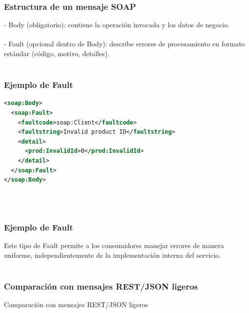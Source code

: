 \documentclass[t,24pt,aspectratio=169]{beamer}
\begin{document}
	\begin{frame}
		\frametitle{Estructura de un mensaje SOAP}
			\vfill
- Body (obligatorio): contiene la operación invocada y los datos de negocio.
\\~\\
- Fault (opcional dentro de Body): describe errores de procesamiento en formato estándar (código, motivo, detalles).
\\~\\
			\vfill
	\end{frame}


	\begin{frame}
		\frametitle{Ejemplo de Fault}
			\vfill

\begin{lstlisting}[language = xml]
<soap:Body>
  <soap:Fault>
    <faultcode>soap:Client</faultcode>
    <faultstring>Invalid product ID</faultstring>
    <detail>
      <prod:InvalidId>0</prod:InvalidId>
    </detail>
  </soap:Fault>
</soap:Body>

\end{lstlisting}

\\~\\
			\vfill
	\end{frame}


	\begin{frame}
		\frametitle{Ejemplo de Fault}
			\vfill
Este tipo de Fault permite a los consumidores manejar errores de manera uniforme, independientemente de la implementación interna del servicio.
\\~\\
			\vfill
	\end{frame}


	\begin{frame}
		\frametitle{Comparación con mensajes REST/JSON ligeros}
			\vfill
			\centering
			\Huge{Comparación con mensajes REST/JSON ligeros}
			\vfill
	\end{frame}
\end{document}
